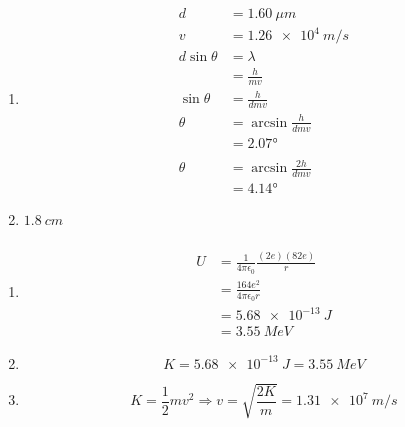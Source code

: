 \documentclass{article}
\begin{document}
\setcounter{subsubsection}{14}
\subsubsection{}

\begin{enumerate}
  \item

        \begin{align*}
          d             & = \qty{1.60}{\mu m}         \\
          v             & = \qty{1.26e4}{m/s}         \\
          d \sin \theta & = \lambda                   \\
                        & = \frac{h}{m v}             \\
          \sin \theta   & = \frac{h}{d m v}           \\
          \theta        & = \arcsin \frac{h}{d m v}   \\
                        & = \ang{2.07}                \\ \\
          \theta        & = \arcsin \frac{2 h}{d m v} \\
                        & = \ang{4.14}
        \end{align*}

  \item $\qty{1.8}{cm}$
\end{enumerate}

\setcounter{subsubsection}{16}
\subsubsection{}

\begin{enumerate}
  \item

        \begin{align*}
          U & = \frac{1}{4 \pi \epsilon_0} \frac{(2 e) (82 e)}{r} \\
            & = \frac{164 e^2}{4 \pi \epsilon_0 r}                \\
            & = \qty{5.68e-13}{J}                                 \\
            & = \qty{3.55}{MeV}
        \end{align*}

  \item \[K = \qty{5.68e-13}{J} = \qty{3.55}{MeV}\]

  \item \[K = \frac{1}{2} m v^2 \Rightarrow v = \sqrt{\frac{2 K}{m}} = \qty{1.31e7}{m/s}\]
\end{enumerate}
\end{document}
